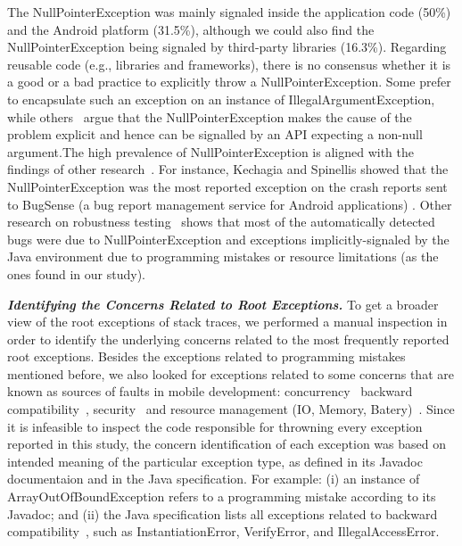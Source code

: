 \documentclass[conference]{IEEEtran}
\begin{document}
 The NullPointerException was mainly signaled inside the application code (50\%) and the Android platform (31.5\%),
 although we could also find the NullPointerException being signaled by third-party libraries (16.3\%). 
Regarding reusable code (e.g., libraries and frameworks), there is no consensus whether it is a good or a bad practice to 
explicitly throw a NullPointerException. Some prefer to encapsulate such an exception on
an instance of IllegalArgumentException, while others~\cite{bloch2008effective} argue that the
NullPointerException makes the cause of the problem explicit and hence 
can be signalled by an API expecting a non-null argument.The high prevalence of NullPointerException is aligned with the
findings of other 
research~\cite{kim2013predicting,fraser20131600,csallner2004jcrasher,kechagia2014}. 
For instance, Kechagia and Spinellis showed that the NullPointerException was the  
most reported exception on the crash reports sent to BugSense (a bug report 
management service for Android applications)  \cite{kechagia2014}.
Other research on robustness testing~\cite{maji2012empirical,csallner2004jcrasher} shows that most of the automatically 
detected bugs were due to NullPointerException and exceptions
implicitly-signaled by the Java 
environment due to programming mistakes or resource limitations
 (as the ones found in our study).


\emph{\textbf{Identifying the Concerns Related to Root Exceptions.}} To get a broader view of the root exceptions of stack traces,
we performed a manual inspection in order to identify the underlying
concerns related to the most frequently reported root exceptions.
Besides the exceptions related to programming mistakes mentioned before, we also looked for exceptions related to some concerns that are known as sources of faults in mobile development: concurrency~\cite{ama2012} backward compatibility~\cite{McDon13}, security~\cite{enck2011study,was2010} and resource management (IO, Memory, Batery)~\cite{Zhang12}. Since it is infeasible to inspect the code responsible for throwning every exception reported in this study,
the concern identification of each exception was based on intended
meaning of the particular exception type, as defined in 
its Javadoc documentaion and in the Java specification. 
For example: (i) an instance of ArrayOutOfBoundException  
refers to a programming mistake according to its Javadoc; and (ii) the Java specification lists all 
exceptions related to backward compatibility~\cite{javaback}, such as
InstantiationError, VerifyError, and IllegalAccessError.
\end{document}
